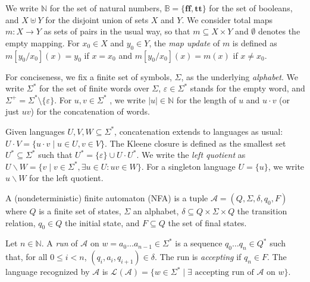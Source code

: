 \documentclass[runningheads, envcountsame, a4paper]{llncs}
\newcommand\LQ[1]{#1\backslash}
\newcommand{\True}{\ensuremath{\mathbf{tt}}}%
\newcommand{\False}{\ensuremath{\mathbf{ff}}}%
\newcommand\nat{\mathbb{N}}
\newcommand\bool{\mathbb{B}}
\newcommand\Rnull{\mathbf0}
\newcommand\Rempty{\mathbf1}
\newcommand\Lang[1][{}]{\mathcal{L}^{#1}}
\begin{document}
We write $\nat$ for the set of natural numbers, $\bool = \{ \False, \True \}$ for the set of
booleans, and $X \uplus Y$ for the disjoint union of sets $X$ and
$Y$. We consider total maps $m:X \to Y$ as sets of pairs in the usual
way, so that $m \subseteq X \times Y$ and $\emptyset$ 
denotes the empty mapping. For $x_0\in X$ and $y_0\in Y$, the \emph{map update} of $m$ is defined as
$m[y_0/x_0] (x) = y_0$ if $x=x_0$ and $m[y_0/x_0] (x) = m (x)$ if $x \ne x_0$.

For conciseness, we fix a finite set of symbols, $\Sigma$,  as the
underlying \emph{alphabet}. We write $\Sigma^*$ for the set of finite words
over $\Sigma$, $\varepsilon\in\Sigma^*$ stands for the empty word, and $\Sigma^+ = \Sigma^*
\setminus \{\varepsilon\}$. For 
$u,v\in\Sigma^*$ , we write $|u|\in\nat$ for the length of $u$ and $u\cdot v $ (or just $uv$) for the
concatenation of words.

Given languages $U,V,W \subseteq \Sigma^*$, 
concatenation extends to languages as usual: $U
\cdot V = \{ u \cdot v \mid u\in U, v \in V\}$.
The Kleene closure is defined as the smallest set $U^* \subseteq \Sigma^*$ such that $U^* = \{\varepsilon\} \cup U
\cdot U^*$.
We write the \emph{left quotient} as $\LQ{U}W
= \{ v \mid v\in \Sigma^*, \exists u\in U: uv \in W \}$. For a singleton language $U = \{u\}$, we write $\LQ{u}W$
for the left quotient.



\begin{definition}
  A (nondeterministic) finite automaton (NFA) is a tuple $\mathcal{A} = (Q, \Sigma, \delta, q_0, F)$ where $Q$ is a finite
  set of states, $\Sigma$ an alphabet, $\delta \subseteq Q \times
  \Sigma \times Q$ the transition relation, $q_0 \in Q$ the initial state, and $F \subseteq Q$ the set of final states.

  Let $n\in\nat$.
  A \emph{run} of $\mathcal{A}$ on $w = a_0\dots a_{n-1}\in \Sigma^*$ is a sequence $q_0\dots q_n \in
  Q^*$ such that, for all $0\le i <n$,
  $(q_i, a_i, q_{i+1}) \in \delta$. The run is \emph{accepting} if $q_n \in F$.
  The language recognized by $\mathcal{A}$ is
  $\Lang (\mathcal{A}) = \{ w \in \Sigma^* \mid \exists
  \textrm{ accepting run of $\mathcal{A}$ on $w$} \}$.
\end{definition}
\end{document}
